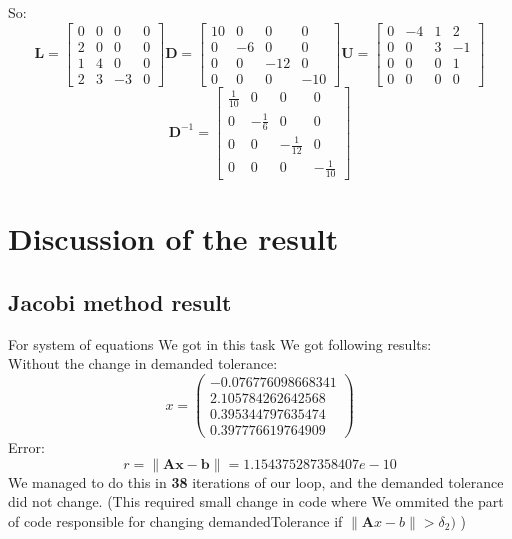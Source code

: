 \documentclass{report}
\begin{document}
So:
\[
\textbf{L} = \begin{bmatrix}
0 & 0 & 0 & 0 \\
2 & 0 & 0 & 0 \\
1 & 4 & 0 & 0 \\
2 & 3 & -3 & 0
\end{bmatrix}
\textbf{D} = \begin{bmatrix}
10 & 0 & 0 & 0 \\
0 & -6 & 0 & 0 \\
0 & 0 & -12 & 0 \\
0 & 0 & 0 & -10
\end{bmatrix}
\textbf{U} = \begin{bmatrix}
0 & -4 & 1 & 2 \\
0 & 0 & 3 & -1 \\
0 & 0 & 0 & 1 \\
0 & 0 & 0 & 0
\end{bmatrix}
\]
\[
\textbf{D}^{-1} = \begin{bmatrix}
\frac{1}{10} & 0 & 0 & 0 \\
0 & - \frac{1}{6} & 0 & 0 \\
0 & 0 & - \frac{1}{12} & 0 \\
0 & 0 & 0 & - \frac{1}{10}
\end{bmatrix}
\]

\section{Discussion of the result}

\subsection{Jacobi method result}
For system of equations We got in this task We got following results:
\\
Without the change in demanded tolerance:
\[ x = \left( \begin{array}{cc}
  -0.076776098668341 \\
   2.105784262642568 \\
   0.395344797635474 \\
   0.397776619764909
\end{array} \right)
\]
Error:
\[ r = \| \mathbf{A}\mathbf{x} - \mathbf{b}\| = 1.154375287358407e-10 \]
We managed to do this in \textbf{38} iterations of our loop, and the demanded tolerance did not change. (This required small change in code where We ommited the part of code responsible for changing demandedTolerance if $ \| \mathbf{A}x-b \| > \delta_2) $ )
\end{document}
